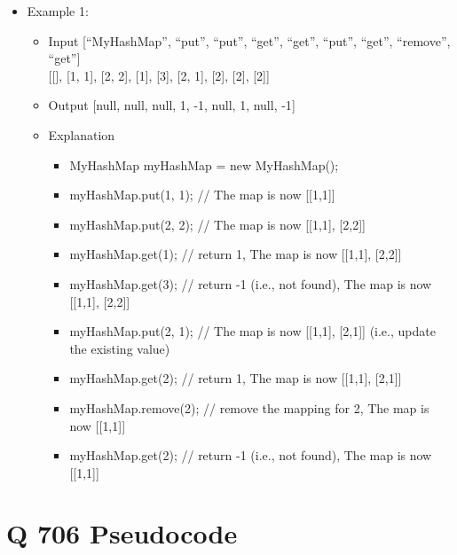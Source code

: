 \documentclass[11pt]{article}
\providecommand{\tightlist}{%
      \setlength{\itemsep}{0pt}\setlength{\parskip}{0pt}}
\begin{document}
\begin{itemize}
\item
  Example 1:

  \begin{itemize}
  \item
    Input {[}``MyHashMap'', ``put'', ``put'', ``get'', ``get'', ``put'',
    ``get'', ``remove'', ``get''{]}\\
    {[}{[}{]}, {[}1, 1{]}, {[}2, 2{]}, {[}1{]}, {[}3{]}, {[}2, 1{]},
    {[}2{]}, {[}2{]}, {[}2{]}{]}
  \item
    Output {[}null, null, null, 1, -1, null, 1, null, -1{]}
  \item
    Explanation

    \begin{itemize}
    \tightlist
    \item
      MyHashMap myHashMap = new MyHashMap();
    \item
      myHashMap.put(1, 1); // The map is now {[}{[}1,1{]}{]}
    \item
      myHashMap.put(2, 2); // The map is now {[}{[}1,1{]}, {[}2,2{]}{]}
    \item
      myHashMap.get(1); // return 1, The map is now {[}{[}1,1{]},
      {[}2,2{]}{]}
    \item
      myHashMap.get(3); // return -1 (i.e., not found), The map is now
      {[}{[}1,1{]}, {[}2,2{]}{]}
    \item
      myHashMap.put(2, 1); // The map is now {[}{[}1,1{]}, {[}2,1{]}{]}
      (i.e., update the existing value)
    \item
      myHashMap.get(2); // return 1, The map is now {[}{[}1,1{]},
      {[}2,1{]}{]}
    \item
      myHashMap.remove(2); // remove the mapping for 2, The map is now
      {[}{[}1,1{]}{]}
    \item
      myHashMap.get(2); // return -1 (i.e., not found), The map is now
      {[}{[}1,1{]}{]}
    \end{itemize}
  \end{itemize}
\end{itemize}

    \section{Q 706 Pseudocode}\label{q-706-pseudocode}
\end{document}
